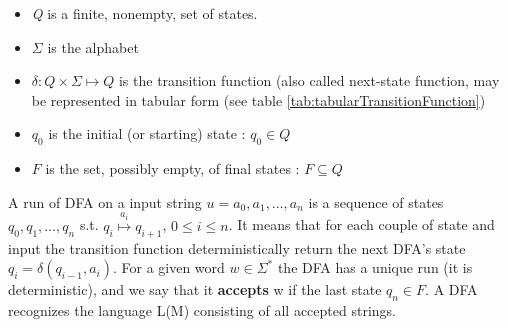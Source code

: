 \begin{itemize}
  \item \textit{Q} is a finite, nonempty, set of states.
\item \begin{math}\Sigma\end{math} is the alphabet
\item \begin{math} \delta : Q \times \Sigma \longmapsto Q  \end{math} is the
transition function (also called next-state function, may be represented in
tabular form  (see table
\ref{tab:tabularTransitionFunction})
\item \begin{math}q_0 \end{math} is the initial (or starting) state :
\begin{math} q_0 \in  Q \end{math}
\item  \begin{math}F \end{math} is the set, possibly empty, of final states :
\begin{math} F \subseteq Q \end{math}

\end{itemize}



A run of DFA on a input string \begin{math}u = a_0,a_1,\ldots,a_n\end{math} is a
sequence of states \\ \begin{math} q_0,q_1,\ldots,q_n\end{math} s.t.
\begin{math}q_i  \overset{a_i}{\longmapsto} q_{i+1} \end{math},
\begin{math} 0 \leq i \le n\end{math}. It means that for each couple of state
and input the transition function deterministically return the next DFA's
state \\ \begin{math}q_i=\delta(q_{i-1},a_{i}) \end{math}.
For a given word \begin{math}\textit{w}\in \Sigma^* \end{math} the DFA has a
unique run (it is deterministic), and we say that it \textbf{accepts} w if the
last state \begin{math}q_n \in F \end{math}. A DFA recognizes the
language L(M) consisting of all accepted strings.


